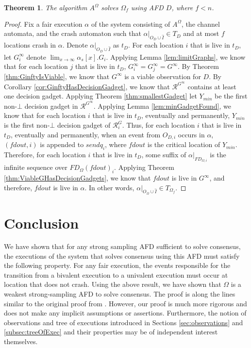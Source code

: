 \documentclass[11pt]{article}
\newtheorem{theorem}{Theorem}
\numberwithin{theorem}{section}
\begin{document}
\begin{theorem}
The algorithm $A^\Omega$ solves $\Omega_f$ using AFD $D$, where $f < n$.
\end{theorem}
\begin{proof}
Fix a fair execution $\alpha$ of the system consisting of $A^\Omega$, the channel automata, and the crash automaton such that $\alpha|_{O_D \cup \hat{I}} \in T_D$ and at most $f$ locations crash in $\alpha$. Denote $\alpha|_{O_D \cup \hat{I}}$ as $t_D$. For each location $i$ that is live in $t_D$, let $G_i^\infty$ denote $\lim_{x \rightarrow \infty} \alpha_s[x].G_i$. Applying Lemma \ref{lem:limitGraphs}, we know that for each location $j$ that is live in $t_D$, $G_i^\infty= G_j^\infty = G^\infty$. By Theorem \ref{thm:GinftyIsViable}, we know that $G^\infty$ is a viable observation for $D$. By Corollary \ref{cor:GinftyHasDecisionGadget}, we know that $\mathcal{R}^{G^\infty}$ contains at least one decision gadget. Applying  Theorem \ref{thm:smallestGadget} let $Y_{min}$ be the first non-$\bot$ decision gadget in $\mathcal{R}^{G^\infty}$. Applying Lemma \ref{lem:minGadgetFound}, we know that for each location $i$ that is live in $t_D$, eventually and permanently, $Y_{min}$ is the first non-$\bot$ decision gadget of $\mathcal{R}^G_i$. Thus, for each location $i$ that is live in $t_D$, eventually and permanently, when an event from $O_{D,i}$ occurs in $\alpha$, $(fdout,i)$ is appended to $sendq_i$, where $fdout$ is the critical location of $Y_{min}$. Therefore, for each location $i$ that is live in $t_D$, some suffix of $\alpha|_{FD_{\Omega,i}}$ is the infinite sequence over $FD_\Omega(fdout)_i$. Applying Theorem \ref{thm:ViableGHasDecisionGadgets}, we know that $fdout$ is live in $G^\infty$, and therefore, $fdout$ is live in $\alpha$. In other words, $\alpha|_{O_\Omega \cup \hat{I}} \in T_{\Omega_f}$.
\end{proof}

 

\section{Conclusion}\label{sec:conclusion}

We have shown that for any strong sampling AFD sufficient to solve consensus, the executions of the system that solves consensus using this AFD must satisfy the following property. For any fair execution, the events responsible for the transition from a bivalent execution to a univalent execution must occur at location that does not crash.
Using the above result, we have shown that $\Omega$ is a weakest strong-sampling AFD to solve consensus. The proof is along the lines similar to the original proof from \cite{chan:twfdf}. However, our proof is much more rigorous and does not make any implicit assumptions or assertions. Furthermore, the notion of observations and tree of executions introduced in Sections \ref{sec:observations}  and \ref{subsec:treeOfExec} and their properties may be of independent interest themselves.



\end{document}
